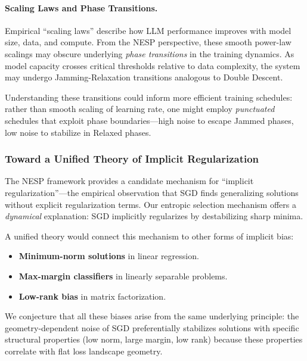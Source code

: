 \paragraph{Scaling Laws and Phase Transitions.} Empirical ``scaling laws'' \cite{kaplan2020scalinglawsneurallanguage} describe how LLM performance improves with model size, data, and compute. From the NESP perspective, these smooth power-law scalings may obscure underlying \textit{phase transitions} in the training dynamics. As model capacity crosses critical thresholds relative to data complexity, the system may undergo Jamming-Relaxation transitions analogous to Double Descent.

Understanding these transitions could inform more efficient training schedules: rather than smooth scaling of learning rate, one might employ \textit{punctuated} schedules that exploit phase boundaries---high noise to escape Jammed phases, low noise to stabilize in Relaxed phases.

\subsubsection{Toward a Unified Theory of Implicit Regularization}

The NESP framework provides a candidate mechanism for ``implicit regularization''---the empirical observation that SGD finds generalizing solutions without explicit regularization terms. Our entropic selection mechanism offers a \textit{dynamical} explanation: SGD implicitly regularizes by destabilizing sharp minima.

A unified theory would connect this mechanism to other forms of implicit bias:
\begin{itemize}[topsep=1pt,itemsep=1pt]
    \item \textbf{Minimum-norm solutions} in linear regression.
    \item \textbf{Max-margin classifiers} in linearly separable problems.
    \item \textbf{Low-rank bias} in matrix factorization.
\end{itemize}

We conjecture that all these biases arise from the same underlying principle: the geometry-dependent noise of SGD preferentially stabilizes solutions with specific structural properties (low norm, large margin, low rank) because these properties correlate with flat loss landscape geometry.

